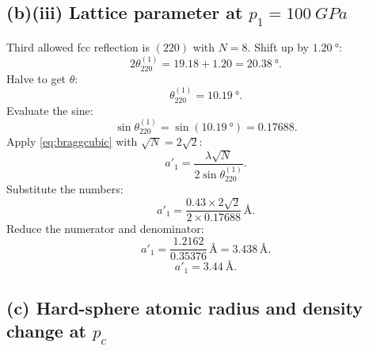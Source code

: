 \documentclass[11pt]{article}
\begin{document}
\begin{center}
\end{center}

\subsection*{(b)(iii) Lattice parameter at $p_1=\SI{100}{GPa}$}

Third allowed fcc reflection is $(220)$ with $N=8$. Shift up by $\SI{1.20}{\degree}$:
\[
2\theta^{(1)}_{220} = 19.18 + 1.20 = \SI{20.38}{\degree}.
\]
Halve to get $\theta$:
\[
\theta^{(1)}_{220} = \SI{10.19}{\degree}.
\]
Evaluate the sine:
\[
\sin\theta^{(1)}_{220} = \sin(\SI{10.19}{\degree}) = 0.17688.
\]
Apply \eqref{eq:braggcubic} with $\sqrt N=2\sqrt 2$:
\[
a'_1 = \frac{\lambda\sqrt N}{2\sin\theta^{(1)}_{220}}.
\]
Substitute the numbers:
\[
a'_1 = \frac{0.43\times 2\sqrt{2}}{2\times 0.17688}\,\si{\angstrom}.
\]
Reduce the numerator and denominator:
\[
a'_1 = \frac{1.2162}{0.35376}\,\si{\angstrom} = 3.438\,\si{\angstrom}.
\]
\begin{equation}
\boxed{\ a'_1 = \SI{3.44}{\angstrom}.\ }
\label{eq:a1box}
\end{equation}

\subsection*{(c) Hard-sphere atomic radius and density change at $p_c$}
\end{document}
